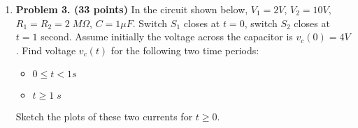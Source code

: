 \begin{enumerate}
\begin{itemize}
\item Different from the simple RCL series resonant circuit, this 
circuit also has a stop band, i.e., around a certain freqnecy 
$\omega_{min}$ the output voltage $V_R$ is zero. Find this frequency 
$V_R$ also in terms of the circuit components. 

\item Given $C=10\;\mu F$ and the two inductors are identical, determine
the values of $R$ and $L_1=L_2$, so that $\omega_{max}=5000\;rad/sec$.

\end{itemize}


{\bf Solution:}
\begin{itemize}
\item Find total impedance of the circuit:
\begin{eqnarray}
 Z&=&R+j\omega L_2+\frac{j\omega L_1/j\omega C}{j\omega L_1+1/j\omega C}
	=R+j\omega L_2+\frac{j\omega L_1}{1-\omega^2 CL_1}
	\nonumber \\
&=&R+\frac{j\omega(L_2(1-\omega^2CL_1)+L_1)}{1-\omega^2 CL_1}
=R+j\omega \frac{L_1+L_2-\omega^2CL_1L_2}{1-\omega^2CL_1}
	\nonumber 
\end{eqnarray}
\item At the resonant frequency $\omega_0=\omega_{max}$, the imaginary 
part of the impedance is zero (minimum), i.e.,
\[	L_1+L_2=\omega^2CL_1L_2,\;\;\;\;\mbox{i.e.}\;\;\;\;
	\omega_0=\frac{1}{\sqrt{CL}},\;\;\;\mbox{where}\;\;\;
	L=\frac{L_1L_2}{L_1+L_2}
\]
\item At the stop frequency $\omega_{min}$, the imaginary part of the 
impedance is infinity (maximum), i.e.,
\[	1-\omega^2CL_1=0, \;\;\;\mbox{i.e.}\;\;\;\;
	\omega_{min}=\frac{1}{\sqrt{CL_1}}	\]

\item As $L_1=L_2$, $L=L_1/2$, and
\[ \omega_0=\frac{1}{\sqrt{CL_1/2}}=5000,\;\;\;\;\mbox{i.e.}\;\;\;\;
	L_1=0.008\;H=8\;mH	\]
\[ \omega_{min}=\frac{1}{\sqrt{CL_1}}=3536\;rad/sec	\]
This is true for any load of $R$.

\end{itemize} 


\item {\bf Problem 3. (33 points)} In the circuit shown below, $V_1=2V$,
$V_2=10V$, $R_1=R_2=2\;M\Omega$, $C=1\mu F$. Switch $S_1$ closes at $t=0$, 
switch $S_2$ closes at $t=1$ second. Assume initially the voltage across
the capacitor is $v_c(0)=4V$. Find voltage $v_c(t)$ for the following 
two time periods:
\begin{itemize}
\item $0\le t < 1 s$
\item $t \ge 1\;s$ 
\end{itemize}
Sketch the plots of these two currents for $t \ge 0$.


\end{enumerate}
